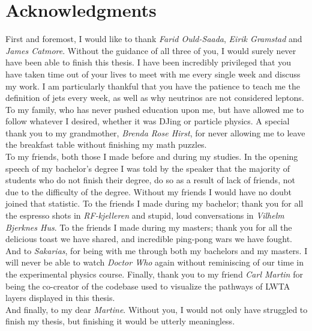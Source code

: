 \chapter*{Acknowledgments}
First and foremost, I would like to thank \emph{Farid Ould-Saada}, \emph{Eirik Gramstad} and \emph{James Catmore}. 
Without the guidance of all three of you, I would surely never have been able to finish this thesis. I have been incredibly
privileged that you have taken time out of your lives to meet with me every single week and discuss my work. 
I am particularly thankful that you have the patience to teach me the definition of jets every week, as well as
why neutrinos are not considered leptons.
\\\newline
To my family, who has never pushed education upon me, but have allowed me to follow whatever I desired, whether it was DJing or 
particle physics. A special thank you to my grandmother, \emph{Brenda Rose Hirst}, for never allowing me to leave the breakfast table 
without finishing my math puzzles.
\\\newline
To my friends, both those I made before and during my studies. In the opening speech of my bachelor's degree I was told by the speaker that 
the majority of students who do not finish their degree, do so as a result of lack of friends, not due to the difficulty of the degree.
Without my friends I would have no doubt joined that statistic. To the friends I made during my bachelor; thank you for all the espresso shots in \emph{RF-kjelleren}
and stupid, loud conversations in \emph{Vilhelm Bjerknes Hus}. To the friends I made during my masters; thank you for all the delicious toast we have shared, and 
incredible ping-pong wars we have fought. And to \emph{Sakarias}, for being with me through both my bachelors and my masters. I will never be able 
to watch \emph{Doctor Who} again without reminiscing of our time in the experimental physics course. Finally, thank you to my friend \emph{Carl Martin} 
for being the co-creator of the codebase used to visualize the pathways of \acs{LWTA} layers displayed in this thesis. 
\\\newline
And finally, to my dear \emph{Martine}. Without you, I would not only have struggled to finish my thesis, but finishing it would be utterly 
meaningless.
